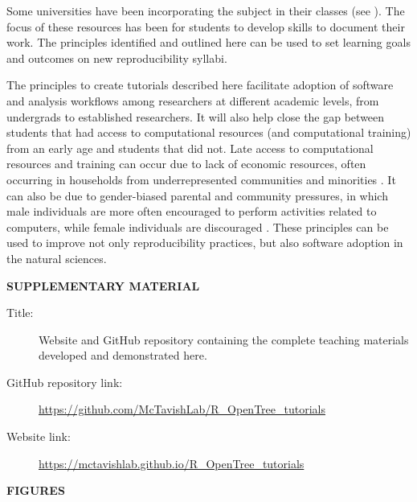 \documentclass[12pt]{article}
\begin{document}
Some universities have been incorporating the subject in their classes (see
\cite{uwlibraries2022, nigms2022}).
The focus of these resources has been for students to develop skills to document their work.
The principles identified and outlined here can be used to set learning goals and
outcomes on new reproducibility syllabi.

The principles to create tutorials described here facilitate adoption of software
 and analysis workflows among researchers at different academic levels, from undergrads
  to established researchers.
It will also help close the gap between students that had access to computational
resources (and computational training) from an early age and students that did not.
Late access to computational resources and training can occur due to lack of
economic resources, often occurring in households from underrepresented communities
and minorities \citep{google2016diversity, warner2021quantifying}.
It can also be due to gender-biased parental and community pressures,
in which male individuals are more often encouraged to perform activities related to computers,
while female individuals are discouraged \citep{warner2021quantifying}.
These principles can be used to improve not only reproducibility practices,
 but also software adoption in the natural sciences.


\bigskip
\begin{center}
{\large\bf SUPPLEMENTARY MATERIAL}
\end{center}

\begin{description}

\item[Title:] Website and GitHub repository containing the complete teaching materials developed and demonstrated here.

\item[GitHub repository link:] \url{https://github.com/McTavishLab/R_OpenTree_tutorials}

\item[Website link:] \url{https://mctavishlab.github.io/R_OpenTree_tutorials}

\end{description}


\bigskip
\bigskip
\bigskip

\begin{center}
{\large\bf FIGURES}
\end{center}
\end{document}
